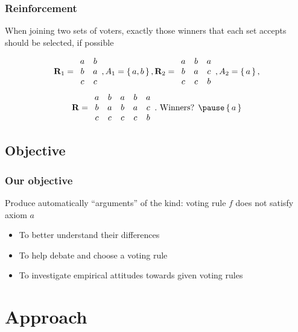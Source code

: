 \documentclass[french,english]{beamer}
\begin{document}
\begin{frame}
	\frametitle{Reinforcement}
	\begin{definition}[Reinforcement]
		When joining two sets of voters, exactly those winners that each set accepts should be selected, if possible
	\end{definition}
	\begin{example}
		\begin{equation}
			\mathbf{R}_1 =
			\begin{array}{cc}
				a&b\\
				b&a\\
				c&c\\
			\end{array},
			A_1 = \set{a, b},
			\mathbf{R}_2 =
			\begin{array}{ccc}
				a&b&a\\
				b&a&c\\
				c&c&b\\
			\end{array},
			A_2 = \set{a},
		\end{equation}
		\begin{equation}
			\prof =
			\begin{array}{ccccc}
				a&b&a&b&a\\
				b&a&b&a&c\\
				c&c&c&c&b\\
			\end{array}.
			\text{ Winners? }
			\pause
			\set{a}
		\end{equation}
	\end{example}
\end{frame}

\subsection{Objective}
\begin{frame}
	\frametitle{Our objective}
	Produce automatically “arguments” of the kind: voting rule $f$ does not satisfy axiom $a$
	\begin{itemize}
		\item To better understand their differences
		\item To help debate and choose a voting rule
		\item To investigate empirical attitudes towards given voting rules
	\end{itemize}
\end{frame}

\section{Approach}
\end{document}
